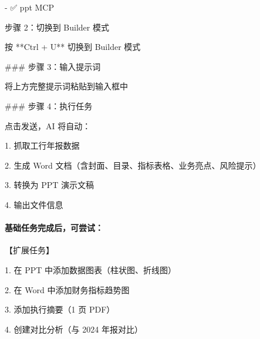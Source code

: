 \documentclass[
  american,
  chinese,
]{ctexart}
\begin{document}
\foreignlanguage{american}{- }\foreignlanguage{american}{✅}\foreignlanguage{american}{
ppt MCP}

{步骤}\foreignlanguage{american}{ 2}{：切换到}\foreignlanguage{american}{ Builder }{模式}\foreignlanguage{american}{}

{按}\foreignlanguage{american}{ **Ctrl + U** }{切换到}\foreignlanguage{american}{ Builder }{模式}\foreignlanguage{american}{}

\foreignlanguage{american}{\#\#\# }{步骤}\foreignlanguage{american}{ 3}{：输入提示词}\foreignlanguage{american}{}

{将上方完整提示词粘贴到输入框中}\foreignlanguage{american}{}

\foreignlanguage{american}{\#\#\# }{步骤}\foreignlanguage{american}{ 4}{：执行任务}\foreignlanguage{american}{}

{点击发送，}\foreignlanguage{american}{AI }{将自动：}\foreignlanguage{american}{}

\foreignlanguage{american}{1. }{抓取工行年报数据}\foreignlanguage{american}{}

\foreignlanguage{american}{2. }{生成}\foreignlanguage{american}{ Word }{文档（含封面、目录、指标表格、业务亮点、风险提示）}\foreignlanguage{american}{}

\foreignlanguage{american}{3. }{转换为}\foreignlanguage{american}{ PPT }{演示文稿}\foreignlanguage{american}{}

\foreignlanguage{american}{4. }{输出文件信息}\foreignlanguage{american}{}

\paragraph{\texorpdfstring{{基础任务完成后，可尝试：}\foreignlanguage{american}{}}{基础任务完成后，可尝试：}}\label{ux57faux7840ux4efbux52a1ux5b8cux6210ux540eux53efux5c1dux8bd5}

{【扩展任务】}\foreignlanguage{american}{}

\foreignlanguage{american}{1. }{在}\foreignlanguage{american}{ PPT }{中添加数据图表（柱状图、折线图）}\foreignlanguage{american}{}

\foreignlanguage{american}{2. }{在}\foreignlanguage{american}{ Word }{中添加财务指标趋势图}\foreignlanguage{american}{}

\foreignlanguage{american}{3. }{添加执行摘要（}\foreignlanguage{american}{1 }{页}\foreignlanguage{american}{ PDF}{）}\foreignlanguage{american}{}

\foreignlanguage{american}{4. }{创建对比分析（与}\foreignlanguage{american}{ 2024 }{年报对比）}\foreignlanguage{american}{}
\end{document}
